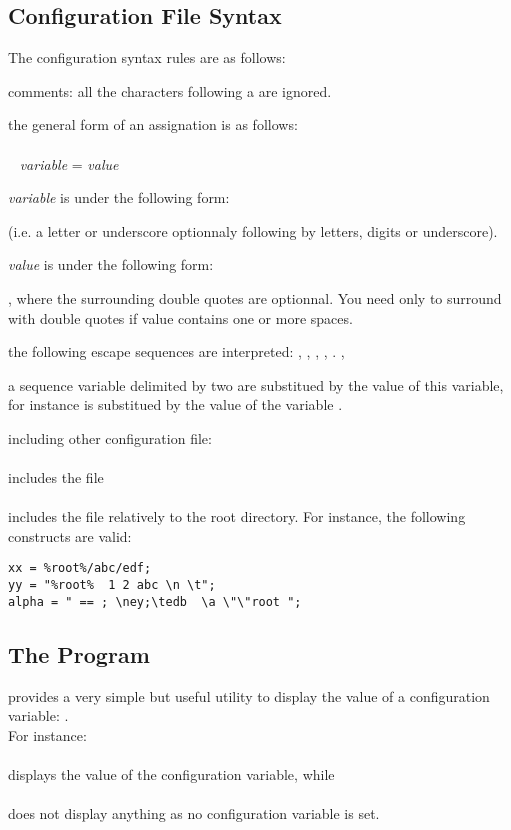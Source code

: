 \subsection{Configuration File Syntax}
The configuration syntax rules are as follows:
\bi
\item comments: all the characters following a \ttv{\#} are ignored.
\item the general form of an assignation is as follows:
\\
\\
\mbox{ } \emph{variable} = \emph{value}\ttv{;}
\item \emph{variable} is under the following form:
\bi
\item \ttv{[a-zA-Z\_][a-zA-Z\_0-9]*} (i.e. a letter or underscore optionnaly
following by letters, digits or underscore).
\ei
\item \emph{value} is under the following form:
\bi
\item {}, where the surrounding double
quotes are optionnal. You need only to surround with double quotes if
value contains one or more spaces.
\item the following escape sequences are interpreted:
, , , , .
, \esc{\bks}
\item a sequence variable delimited by two \ttv{\%} are substitued by the value
of this variable, for instance  is substitued by the value of the
variable .
\ei
\item including other configuration file:
\\
\\
includes the file 
\\
\\
includes the file  relatively to the root \eyedb
directory.
\ei
For instance, the following constructs are valid:
\begin{verbatim}
xx = %root%/abc/edf;
yy = "%root%  1 2 abc \n \t";
alpha = " == ; \ney;\tedb  \a \"\"root ";
\end{verbatim}
\subsection{The  Program}
\eyedb provides a very simple but useful utility to display the
value of a configuration variable: .
\\
For instance:\\
\mbox{ }\\
displays the value of the  configuration variable, while\\
\mbox{ }\\
does not display anything as no configuration variable  is
set.
